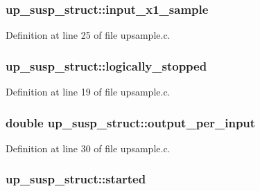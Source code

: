 \subsubsection[{\texorpdfstring{input\+\_\+x1\+\_\+sample}{input_x1_sample}}]{ up\+\_\+susp\+\_\+struct\+::input\+\_\+x1\+\_\+sample}\hypertarget{structup__susp__struct_a724b5c7a7f24c4c459f57fc533bb4bd4}{}\label{structup__susp__struct_a724b5c7a7f24c4c459f57fc533bb4bd4}


Definition at line 25 of file upsample.\+c.

\subsubsection[{\texorpdfstring{logically\+\_\+stopped}{logically_stopped}}]{ up\+\_\+susp\+\_\+struct\+::logically\+\_\+stopped}\hypertarget{structup__susp__struct_ae214d57a2638557d935796a1ec5b72be}{}\label{structup__susp__struct_ae214d57a2638557d935796a1ec5b72be}


Definition at line 19 of file upsample.\+c.

\subsubsection[{\texorpdfstring{output\+\_\+per\+\_\+input}{output_per_input}}]{\setlength{\rightskip}{0pt plus 5cm}double up\+\_\+susp\+\_\+struct\+::output\+\_\+per\+\_\+input}\hypertarget{structup__susp__struct_a18fdb9d88254ffa47b13ebb46a03dfe4}{}\label{structup__susp__struct_a18fdb9d88254ffa47b13ebb46a03dfe4}


Definition at line 30 of file upsample.\+c.

\subsubsection[{\texorpdfstring{started}{started}}]{ up\+\_\+susp\+\_\+struct\+::started}\hypertarget{structup__susp__struct_aa403483c9275f66ddf29206d5169a8fc}{}\label{structup__susp__struct_aa403483c9275f66ddf29206d5169a8fc}


